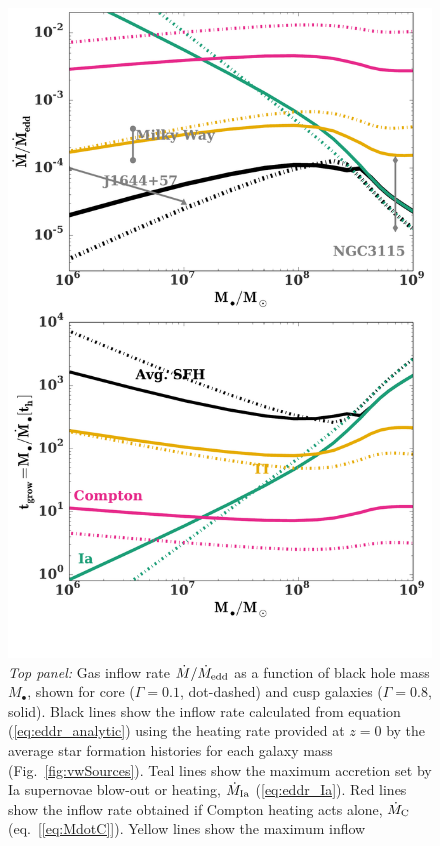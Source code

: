 \documentclass[usenatbib,fleqn]{mn2e}
\begin{document}
\begin{figure}
\includegraphics[width=\columnwidth]{mdot_sfr.pdf}
\caption{\label{fig:bh_growth} {\it Top panel:} Gas inflow rate
  $\dot{M}/\dot{M}_{\rm edd}$ as a function of black hole mass
  $M_{\bullet}$, shown for core ($\Gamma=0.1$, dot-dashed) and cusp
  galaxies ($\Gamma=0.8$, solid).  Black lines show the inflow rate
  calculated from equation (\ref{eq:eddr_analytic}) using the heating
  rate provided at $z = 0$ by the average star formation histories for
  each galaxy mass (Fig.~\ref{fig:vwSources}).  Teal lines show the
  maximum accretion set by Ia supernovae blow-out or heating,
  $\dot{M}_{\rm Ia}$ (\ref{eq:eddr_Ia}).  Red lines show the inflow
  rate obtained if Compton heating acts alone, $\dot{M}_{\rm C}$
  (eq.~[\ref{eq:MdotC}]).  Yellow lines show the maximum inflow
}
\end{figure}
\end{document}
